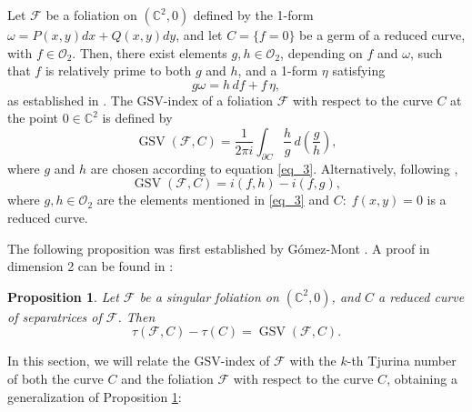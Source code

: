 \documentclass[12pt,letterpaper]{amsart}
\newcommand{\C}{\mathbb{C}}
\newcommand{\F}{\mathcal{F}}
\newtheorem{proposition}[theorem]{Proposition}
\begin{document}
Let $\F$ be a foliation on $(\mathbb{C}^{2},0)$ defined by the 1-form $\omega=P(x,y)dx +Q(x,y)dy$, and let $C=\{f=0\}$ be a germ of a reduced curve, with $f\in\mathcal{O}_2$. Then, there exist elements $g, h \in \mathcal{O}_2$, depending on $f$ and $\omega$, such that $f$ is relatively prime to both $g$ and $h$, and a 1-form $\eta$ satisfying
\begin{equation} \label{eq_3}
    g\omega = h\,df + f\,\eta,
\end{equation}
as established in \cite[Lemma~1.1]{Suwa}. The GSV-index of a foliation $\mathcal{F}$ with respect to the curve $C$ at the point $0\in\C^2$ is defined by
\begin{equation*} \label{eq:GSVintegral}
    \operatorname{GSV}(\mathcal{F}, C) = \frac{1}{2\pi i} \int_{\partial C} \frac{h}{g} \, d\left( \frac{g}{h} \right),
\end{equation*}
where $g$ and $h$ are chosen according to equation \eqref{eq_3}. Alternatively, following \cite{Evelia},
\begin{equation}\label{gsv_inter}
\operatorname{GSV}(\mathcal{F},C)=i(f,h)-i(f,g),
\end{equation}
where \(g,h\in\mathcal{O}_2\) are the elements mentioned in \eqref{eq_3} and  \(C:\;f(x,y)=0\) is a reduced curve.

The following proposition was first established by Gómez-Mont \cite[Theorem 1]{Gomez}. A proof in dimension 2 can be found in \cite[Proposition 6.2]{Evelia}:  
\begin{proposition}\label{prop_gomez}
    Let \(\mathcal{F}\) be a singular foliation on \((\mathbb{C}^2, 0)\), and \(C\) a reduced curve of separatrices of \(\mathcal{F}\). Then
\[
\tau(\mathcal{F}, C) - \tau(C) = \operatorname{GSV}(\mathcal{F}, C).
\]
\end{proposition}

In this section, we will relate the GSV-index of $\F$ with the $k$-th Tjurina number of both the curve $C$ and the foliation $\F$ with respect to the curve $C$, obtaining a generalization of Proposition \ref{prop_gomez}:  
\end{document}
